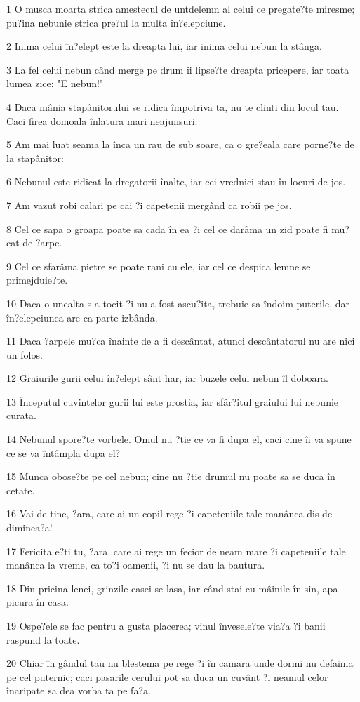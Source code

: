 \par 1 O musca moarta strica amestecul de untdelemn al celui ce pregate?te miresme; pu?ina nebunie strica pre?ul la multa în?elepciune.
\par 2 Inima celui în?elept este la dreapta lui, iar inima celui nebun la stânga.
\par 3 La fel celui nebun când merge pe drum îi lipse?te dreapta pricepere, iar toata lumea zice: "E nebun!"
\par 4 Daca mânia stapânitorului se ridica împotriva ta, nu te clinti din locul tau. Caci firea domoala înlatura mari neajunsuri.
\par 5 Am mai luat seama la înca un rau de sub soare, ca o gre?eala care porne?te de la stapânitor:
\par 6 Nebunul este ridicat la dregatorii înalte, iar cei vrednici stau în locuri de jos.
\par 7 Am vazut robi calari pe cai ?i capetenii mergând ca robii pe jos.
\par 8 Cel ce sapa o groapa poate sa cada în ea ?i cel ce darâma un zid poate fi mu?cat de ?arpe.
\par 9 Cel ce sfarâma pietre se poate rani cu ele, iar cel ce despica lemne se primejduie?te.
\par 10 Daca o unealta s-a tocit ?i nu a fost ascu?ita, trebuie sa îndoim puterile, dar în?elepciunea are ca parte izbânda.
\par 11 Daca ?arpele mu?ca înainte de a fi descântat, atunci descântatorul nu are nici un folos.
\par 12 Graiurile gurii celui în?elept sânt har, iar buzele celui nebun îl doboara.
\par 13 Începutul cuvintelor gurii lui este prostia, iar sfâr?itul graiului lui nebunie curata.
\par 14 Nebunul spore?te vorbele. Omul nu ?tie ce va fi dupa el, caci cine îi va spune ce se va întâmpla dupa el?
\par 15 Munca obose?te pe cel nebun; cine nu ?tie drumul nu poate sa se duca în cetate.
\par 16 Vai de tine, ?ara, care ai un copil rege ?i capeteniile tale manânca dis-de-diminea?a!
\par 17 Fericita e?ti tu, ?ara, care ai rege un fecior de neam mare ?i capeteniile tale manânca la vreme, ca to?i oamenii, ?i nu se dau la bautura.
\par 18 Din pricina lenei, grinzile casei se lasa, iar când stai cu mâinile în sin, apa picura în casa.
\par 19 Ospe?ele se fac pentru a gusta placerea; vinul învesele?te via?a ?i banii raspund la toate.
\par 20 Chiar în gândul tau nu blestema pe rege ?i în camara unde dormi nu defaima pe cel puternic; caci pasarile cerului pot sa duca un cuvânt ?i neamul celor înaripate sa dea vorba ta pe fa?a.

